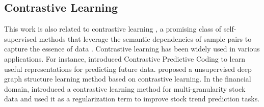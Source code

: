 \subsection{Contrastive Learning}
This work is also related to contrastive learning , a promising class of self-supervised methods that leverage the semantic dependencies of sample pairs to capture the essence of data \cite{chen2021exploring, lin2022prototypical, li2020prototypical, caron2020unsupervised}. Contrastive learning has been widely used in various applications. For instance, \cite{oord2018representation} introduced Contrastive Predictive Coding to learn useful representations for predicting future data. \cite{liu2022towards} proposed a unsupervised deep graph structure learning method based on contrastive learning. In the financial domain, \cite{hou2021stock} introduced a contrastive learning method for multi-granularity stock data and used it as a regularization term to improve stock trend prediction tasks.